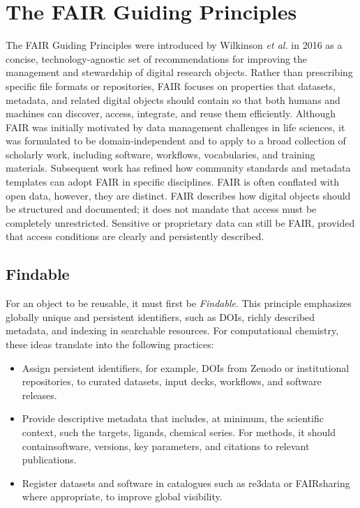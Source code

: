 \documentclass[12pt]{article}
\begin{document}
\section{The FAIR Guiding Principles}

The FAIR Guiding Principles were introduced by Wilkinson \emph{et al.} in 2016 as a concise, technology-agnostic set of recommendations for improving the management and stewardship of digital research objects.\cite{CH12_wilkinson2016FAIR} Rather than prescribing specific file formats or repositories, FAIR focuses on properties that datasets, metadata, and related digital objects should contain so that both humans and machines can discover, access, integrate, and reuse them efficiently.\cite{CH12_wilkinson2016FAIR,CH12_goFairPrinciples} Although FAIR was initially motivated by data management challenges in life sciences, it was formulated to be domain-independent and to apply to a broad collection of scholarly work, including software, workflows, vocabularies, and training materials.\cite{CH12_wilkinson2016FAIR,CH12_goFairPrinciples,CH12_turingWayFAIR} Subsequent work has refined how community standards and metadata templates can adopt FAIR in specific disciplines.\cite{CH12_communityTemplates2022,CH12_healthFAIR2022} FAIR is often conflated with open data, however, they are distinct. FAIR describes how digital objects should be structured and documented; it does not mandate that access must be completely unrestricted. Sensitive or proprietary data can still be FAIR, provided that access conditions are clearly and persistently described.\cite{CH12_goFairPrinciples,CH12_nnlmFAIR}

\subsection{Findable}

For an object to be reusable, it must first be \emph{Findable}. This principle emphasizes globally unique and persistent identifiers, such as DOIs, richly described metadata, and indexing in searchable resources.\cite{CH12_wilkinson2016FAIR,CH12_goFairPrinciples,CH12_turingWayFAIR} For computational chemistry, these ideas translate into the following practices:

\begin{itemize}
  \item Assign persistent identifiers, for example, DOIs from Zenodo or institutional repositories, to curated datasets, input decks, workflows, and software releases.
  \item Provide descriptive metadata that includes, at minimum, the scientific context, such the targets, ligands, chemical series. For methods, it should containsoftware, versions, key parameters, and citations to relevant publications.
  \item Register datasets and software in catalogues such as re3data or FAIRsharing where appropriate, to improve global visibility.
\end{itemize}
\end{document}
